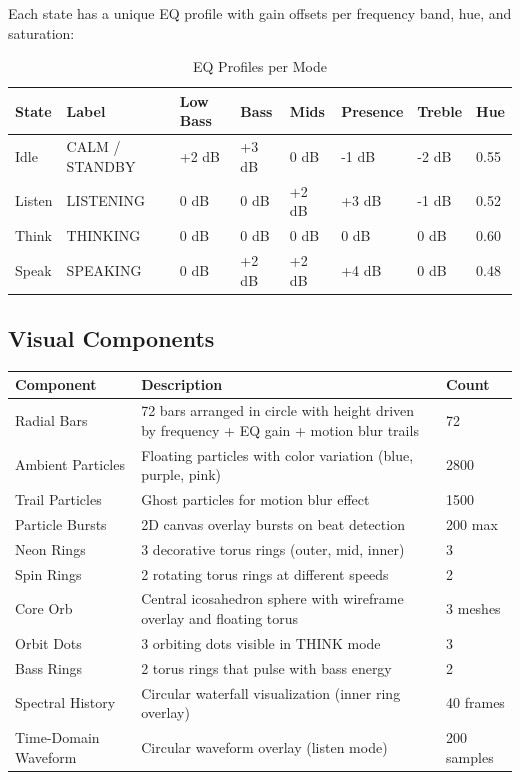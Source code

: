 \documentclass[12pt,a4paper,twoside]{report}
\begin{document}
Each state has a unique EQ profile with gain offsets per frequency band, hue, and saturation:

\begin{table}[H]
\centering
\begin{tabularx}{\textwidth}{|l|X|l|l|l|l|l|l|}
\hline
\rowcolor{phiblue!20}
\textbf{State} & \textbf{Label} & \textbf{Low Bass} & \textbf{Bass} & \textbf{Mids} & \textbf{Presence} & \textbf{Treble} & \textbf{Hue} \\
\hline
Idle & CALM / STANDBY & +2 dB & +3 dB & 0 dB & -1 dB & -2 dB & 0.55 \\
\hline
Listen & LISTENING & 0 dB & 0 dB & +2 dB & +3 dB & -1 dB & 0.52 \\
\hline
Think & THINKING & 0 dB & 0 dB & 0 dB & 0 dB & 0 dB & 0.60 \\
\hline
Speak & SPEAKING & 0 dB & +2 dB & +2 dB & +4 dB & 0 dB & 0.48 \\
\hline
\end{tabularx}
\caption{EQ Profiles per Mode}
\end{table}

\subsection{Visual Components}

\begin{longtable}{|l|p{6cm}|l|}
\hline
\rowcolor{phiblue!20}
\textbf{Component} & \textbf{Description} & \textbf{Count} \\
\hline
Radial Bars & 72 bars arranged in circle with height driven by frequency + EQ gain + motion blur trails & 72 \\
\hline
Ambient Particles & Floating particles with color variation (blue, purple, pink) & 2800 \\
\hline
Trail Particles & Ghost particles for motion blur effect & 1500 \\
\hline
Particle Bursts & 2D canvas overlay bursts on beat detection & 200 max \\
\hline
Neon Rings & 3 decorative torus rings (outer, mid, inner) & 3 \\
\hline
Spin Rings & 2 rotating torus rings at different speeds & 2 \\
\hline
Core Orb & Central icosahedron sphere with wireframe overlay and floating torus & 3 meshes \\
\hline
Orbit Dots & 3 orbiting dots visible in THINK mode & 3 \\
\hline
Bass Rings & 2 torus rings that pulse with bass energy & 2 \\
\hline
Spectral History & Circular waterfall visualization (inner ring overlay) & 40 frames \\
\hline
Time-Domain Waveform & Circular waveform overlay (listen mode) & 200 samples \\
\hline
\end{longtable}
\caption{Equalizer Visual Components}
\end{document}
